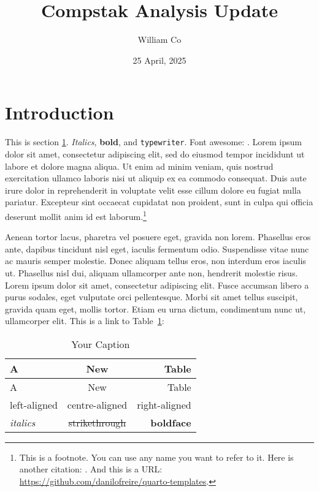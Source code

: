 \documentclass[12pt,british,]{article}
\title{Compstak Analysis Update}
\author{William Co}
\date{25 April, 2025}
\begin{document}
\maketitle




\newpage

\section{Introduction}\label{sec-introduction}

This is section \ref{sec-introduction}. \emph{Italics}, \textbf{bold},
and \texttt{typewriter}. Font awesome: 
. Lorem ipsum dolor sit amet, consectetur adipiscing
elit, sed do eiusmod tempor incididunt ut labore et dolore magna aliqua.
Ut enim ad minim veniam, quis nostrud exercitation ullamco laboris nisi
ut aliquip ex ea commodo consequat. Duis aute irure dolor in
reprehenderit in voluptate velit esse cillum dolore eu fugiat nulla
pariatur. Excepteur sint occaecat cupidatat non proident, sunt in culpa
qui officia deserunt mollit anim id est laborum.\footnote{This is a
  footnote. You can use any name you want to refer to it. Here is
  another citation: \citet[10--15]{freire2018evaluating}. And this is a
  URL: \url{https://github.com/danilofreire/quarto-templates}.}

Aenean tortor lacus, pharetra vel posuere eget, gravida non lorem.
Phasellus eros ante, dapibus tincidunt nisl eget, iaculis fermentum
odio. Suspendisse vitae nunc ac mauris semper molestie. Donec aliquam
tellus eros, non interdum eros iaculis ut. Phasellus nisl dui, aliquam
ullamcorper ante non, hendrerit molestie risus. Lorem ipsum dolor sit
amet, consectetur adipiscing elit. Fusce accumsan libero a purus
sodales, eget vulputate orci pellentesque. Morbi sit amet tellus
suscipit, gravida quam eget, mollis tortor. Etiam eu urna dictum,
condimentum nunc ut, ullamcorper elit. This is a link to
Table~\ref{tbl-markdown}:

\begin{longtable}[]{@{}lcr@{}}
\caption{Your Caption}\label{tbl-markdown}\tabularnewline
\toprule\noalign{}
A & New & Table \\
\midrule\noalign{}
\endfirsthead
\toprule\noalign{}
A & New & Table \\
\midrule\noalign{}
\endhead
\bottomrule\noalign{}
\endlastfoot
left-aligned & centre-aligned & right-aligned \\
\emph{italics} & \st{strikethrough} & \textbf{boldface} \\
\end{longtable}
\end{document}
